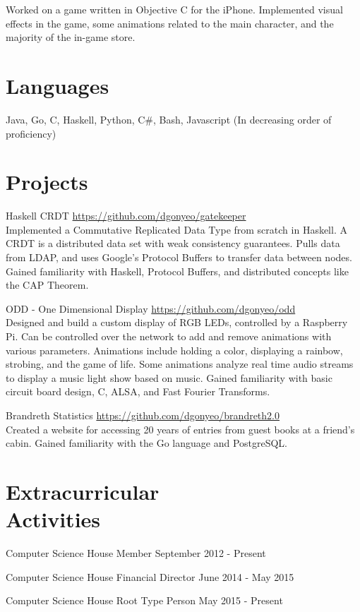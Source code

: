 \documentclass[letterpaper,margin,line,11pt]{resume}
\newcommand{\rurl}[1]{\hfill {\footnotesize \url{#1}}}
\begin{document}
\begin{resume}
\begin{asparadesc}
        \small
        Worked on a game written in Objective C for the iPhone. Implemented visual effects in the game, some animations related to the main character, and the majority of the in-game store.
        \normalsize
    \end{asparadesc}

\section{\mysidestyle Languages}
    Java, Go, C, Haskell, Python, C\#, Bash, Javascript 
    \hfill 
    \footnotesize 
    (In decreasing order of proficiency)
    \normalsize

\section{\mysidestyle Projects}
    \begin{compactdesc}
        \item[Haskell CRDT] \rurl{https://github.com/dgonyeo/gatekeeper} \\
            Implemented a Commutative Replicated Data Type from scratch in Haskell. A CRDT is a distributed data set with weak consistency guarantees. Pulls data from LDAP, and uses Google's Protocol Buffers to transfer data between nodes. Gained familiarity with Haskell, Protocol Buffers, and distributed concepts like the CAP Theorem.
        \item[ODD - One Dimensional Display] \rurl{https://github.com/dgonyeo/odd} \\
            Designed and build a custom display of RGB LEDs, controlled by a Raspberry Pi. Can be controlled over the network to add and remove animations with various parameters. Animations include holding a color, displaying a rainbow, strobing, and the game of life. Some animations analyze real time audio streams to display a music light show based on music. Gained familiarity with basic circuit board design, C, ALSA, and Fast Fourier Transforms.
        \item[Brandreth Statistics] \rurl{https://github.com/dgonyeo/brandreth2.0} \\
            Created a website for accessing 20 years of entries from guest books at a friend's cabin. Gained familiarity with the Go language and PostgreSQL.
    \end{compactdesc}

\section{\mysidestyle Extracurricular \\ Activities}
    \begin{asparablank}
        \item Computer Science House Member \hfill September 2012 - Present
        \item Computer Science House Financial Director \hfill June 2014 - May 2015
        \item Computer Science House Root Type Person \hfill May 2015 - Present
    \end{asparablank}

\end{resume}
\end{document}
